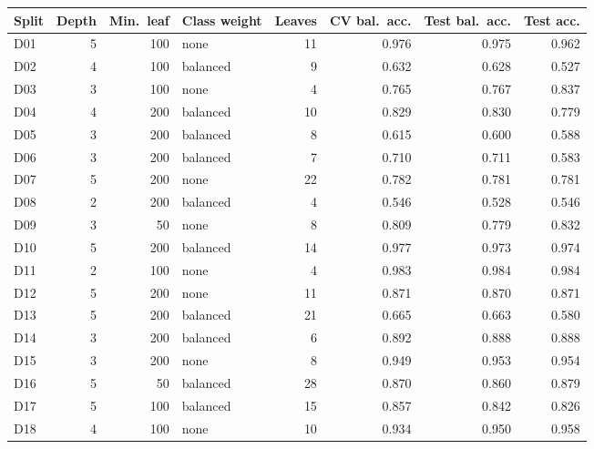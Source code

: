 \begin{tabular}{lrrlrrrr}
\hline
Split & Depth & Min.\ leaf & Class weight & Leaves & CV bal.\ acc. & Test bal.\ acc. & Test acc. \\
\hline
D01 & 5 & 100 & none & 11 & 0.976 & 0.975 & 0.962 \\
D02 & 4 & 100 & balanced & 9 & 0.632 & 0.628 & 0.527 \\
D03 & 3 & 100 & none & 4 & 0.765 & 0.767 & 0.837 \\
D04 & 4 & 200 & balanced & 10 & 0.829 & 0.830 & 0.779 \\
D05 & 3 & 200 & balanced & 8 & 0.615 & 0.600 & 0.588 \\
D06 & 3 & 200 & balanced & 7 & 0.710 & 0.711 & 0.583 \\
D07 & 5 & 200 & none & 22 & 0.782 & 0.781 & 0.781 \\
D08 & 2 & 200 & balanced & 4 & 0.546 & 0.528 & 0.546 \\
D09 & 3 & 50 & none & 8 & 0.809 & 0.779 & 0.832 \\
D10 & 5 & 200 & balanced & 14 & 0.977 & 0.973 & 0.974 \\
D11 & 2 & 100 & none & 4 & 0.983 & 0.984 & 0.984 \\
D12 & 5 & 200 & none & 11 & 0.871 & 0.870 & 0.871 \\
D13 & 5 & 200 & balanced & 21 & 0.665 & 0.663 & 0.580 \\
D14 & 3 & 200 & balanced & 6 & 0.892 & 0.888 & 0.888 \\
D15 & 3 & 200 & none & 8 & 0.949 & 0.953 & 0.954 \\
D16 & 5 & 50 & balanced & 28 & 0.870 & 0.860 & 0.879 \\
D17 & 5 & 100 & balanced & 15 & 0.857 & 0.842 & 0.826 \\
D18 & 4 & 100 & none & 10 & 0.934 & 0.950 & 0.958 \\
\hline
\end{tabular}
